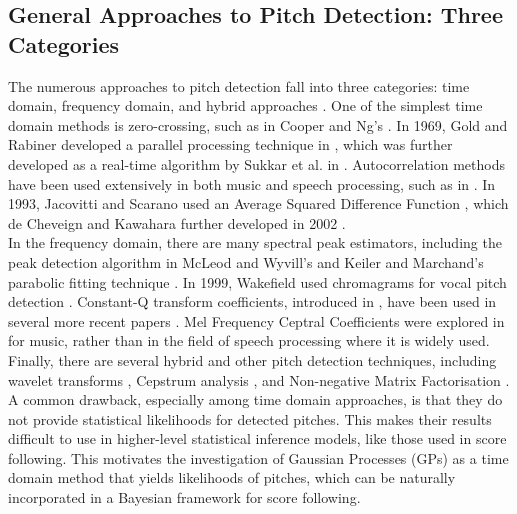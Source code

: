 \subsection{General Approaches to Pitch Detection: Three Categories}
The numerous approaches to pitch detection fall into three categories: time domain, frequency domain, and hybrid approaches \cite{McLeod2008FastAP}. One of the simplest time domain methods is zero-crossing, such as in Cooper and Ng's \cite{zero_crossing}. In 1969, Gold and Rabiner developed a parallel processing technique in \cite{Gold_Rabiner}, which was further developed as a real-time algorithm by Sukkar et al. in \cite{Sukkar}. Autocorrelation methods have been used extensively in both music and speech processing, such as in \cite{Rabiner}. In 1993, Jacovitti and Scarano used an Average Squared Difference Function \cite{Jacovitti}, which de Cheveign and Kawahara further developed in 2002 \cite{Yin}. \\

In the frequency domain, there are many spectral peak estimators, including the peak detection algorithm in McLeod and Wyvill's \cite{Mcleod} and Keiler and Marchand's parabolic fitting technique \cite{Keiler}. In 1999, Wakefield used chromagrams for vocal pitch detection \cite{wakefield99_maveba}. Constant-Q transform coefficients, introduced in \cite{Youngberg}, have been used in several more recent papers \cite{Nakamura}\cite{Chen}. Mel Frequency Ceptral Coefficients were explored in \cite{Logan2000MelFC} for music, rather than in the field of speech processing where it is widely used. \\

Finally, there are several hybrid and other pitch detection techniques, including wavelet transforms \cite{7d015f6ce44c4b199dae7db41389965a}, Cepstrum  analysis \cite{Noll}, and Non-negative Matrix Factorisation \cite{godsill_2006_bayesian}.\\

A common drawback, especially among time domain approaches, is that they do not provide statistical likelihoods for detected pitches. This makes their results difficult to use in higher-level statistical inference models, like those used in score following. This motivates the investigation of Gaussian Processes (GPs) as a time domain method that yields likelihoods of pitches, which can be naturally incorporated in a Bayesian framework for score following.       

